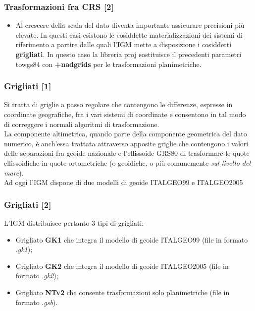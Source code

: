 \documentclass{beamer}
\begin{document}
{\begin{frame}
\begin{itemize}

\end{itemize}
\end{frame}

\begin{frame}
	\frametitle{Trasformazioni fra CRS [2]}
	\begin{itemize}
		\item Al crescere della scala del dato diventa importante assicurare precisioni più elevate. In questi casi esistono le cosiddette materializzazioni dei sistemi di riferimento a partire dalle quali l’IGM mette a disposizione i cosiddetti \textbf{grigliati}. In questo caso la libreria proj sostituisce il precedenti parametri towgs84 con \textbf{+nadgrids} per le trasformazioni planimetriche.
	\end{itemize}
\end{frame}

\begin{frame}
\frametitle{Grigliati [1]}
Si tratta di griglie a passo regolare che contengono le differenze, espresse in coordinate geografiche, fra i vari sistemi di coordinate e consentono in tal modo di correggere i normali algoritmi di trasformazione.
\\ \vspace{10pt}
La componente altimetrica, quando parte della componente geometrica del dato numerico, è anch’essa trattata attraverso apposite griglie che contengono i valori delle separazioni fra geoide nazionale e l’ellissoide GRS80 di trasformare le quote ellissoidiche in quote ortometriche (o geoidiche, o più comunemente \textit{sul livello del mare}).
\\ Ad oggi l’IGM dispone di due modelli di geoide ITALGEO99 e ITALGEO2005
\end{frame}

\begin{frame}
\frametitle{Grigliati [2]}
L'IGM distribuisce pertanto 3 tipi di grigliati:
\begin{itemize}
	\item Grigliato \textbf{GK1} che integra il modello di geoide ITALGEO99 (file in formato .\textit{gk1});
	\item Grigliato \textbf{GK2} che integra il modello di geoide ITALGEO2005 (file in formato .\textit{gk2});
	\item Grigliato \textbf{NTv2} che consente trasformazioni solo planimetriche (file in formato .\textit{gsb}).
\end{itemize}
\end{frame}

}
\end{document}
